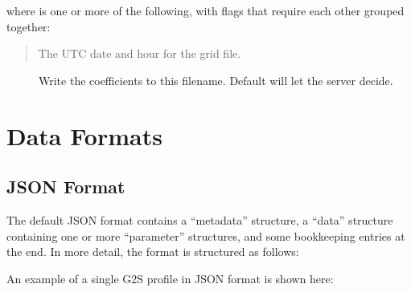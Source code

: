 \documentclass[letterpaper,10pt,english]{sphinxmanual}
\begin{document}
\sphinxAtStartPar
{}

\sphinxAtStartPar
where \sphinxcode{\sphinxupquote{{[}flags{]}}} is one or more of the following, with flags that require each other grouped together:

\sphinxAtStartPar
{}
\begin{quote}

\sphinxAtStartPar
The UTC date and hour for the grid file.
\end{quote}

\sphinxAtStartPar
{}
\begin{description}
\item[{}] \leavevmode
\sphinxAtStartPar
Write the coefficients to this filename.  Default will let the server decide.

\item[{}] \leavevmode
\sphinxAtStartPar
{}

\end{description}


\section{Data Formats}
\label{\detokenize{formats:data-formats}}\label{\detokenize{formats:formats}}\label{\detokenize{formats::doc}}

\subsection{JSON Format}
\label{\detokenize{formats:json-format}}
\sphinxAtStartPar
The default JSON format contains a “metadata” structure, a “data” structure containing one or more “parameter” structures, and some bookkeeping entries at the end.  In more detail, the format is structured as follows:

\sphinxAtStartPar
{}

\sphinxAtStartPar
An example of a single G2S profile in JSON format is shown here:
\end{document}
